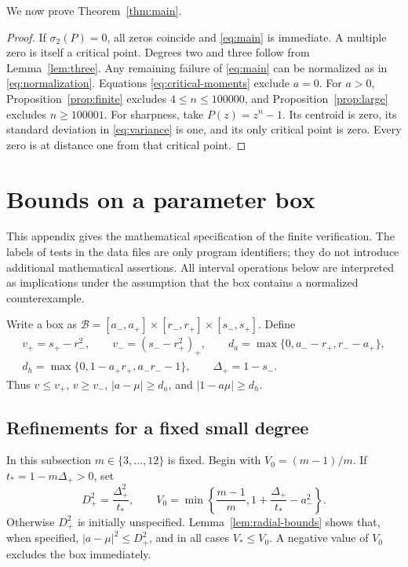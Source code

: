 \documentclass[11pt,reqno]{amsart}
\theoremstyle{definition}
\theoremstyle{remark}
\numberwithin{equation}{section}
\begin{document}
We now prove Theorem~\ref{thm:main}.

\begin{proof}
If $\sigma_2(P)=0$, all zeros coincide and \eqref{eq:main} is immediate. A multiple zero is itself a critical point. Degrees two and three follow from Lemma~\ref{lem:three}. Any remaining failure of \eqref{eq:main} can be normalized as in \eqref{eq:normalization}. Equations \eqref{eq:critical-moments} exclude $a=0$. For $a>0$, Proposition~\ref{prop:finite} excludes $4\le n\le100000$, and Proposition~\ref{prop:large} excludes $n\ge100001$.
For sharpness, take $P(z)=z^n-1$. Its centroid is zero, its standard deviation in \eqref{eq:variance} is one, and its only critical point is zero. Every zero is at distance one from that critical point.
\end{proof}

\appendix
\section{Bounds on a parameter box}\label{app:boxes}

This appendix gives the mathematical specification of the finite verification. The labels of tests in the data files are only program identifiers; they do not introduce additional mathematical assertions. All interval operations below are interpreted as implications under the assumption that the box contains a normalized counterexample.

Write a box as
$\mathcal B=[a_-,a_+]\times[r_-,r_+]\times[s_-,s_+]$.
Define
\[
 \begin{gathered}
 v_+=s_+-r_-^2,\qquad v_-=(s_--r_+^2)_+,\qquad
 d_a=\max\{0,a_--r_+,r_--a_+\},\\
 d_h=\max\{0,1-a_+r_+,a_-r_--1\},\qquad
 \Delta_+=1-s_-.
 \end{gathered}
\]
Thus $v\le v_+$, $v\ge v_-$, $|a-\mu|\ge d_a$, and $|1-a\mu|\ge d_h$.

\subsection{Refinements for a fixed small degree}\label{app:low}

In this subsection $m\in\{3,\ldots,12\}$ is fixed. Begin with $V_0=(m-1)/m$. If $t_*=1-m\Delta_+>0$, set
\[
 D_+^2=\frac{\Delta_+^2}{t_*},\qquad
 V_0=\min\left\{\frac{m-1}{m},1+\frac{\Delta_+}{t_*}-a_-^2\right\}.
\]
Otherwise $D_+^2$ is initially unspecified. Lemma~\ref{lem:radial-bounds} shows that, when specified, $|a-\mu|^2\le D_+^2$, and in all cases $V_*\le V_0$. A negative value of $V_0$ excludes the box immediately.
\end{document}
